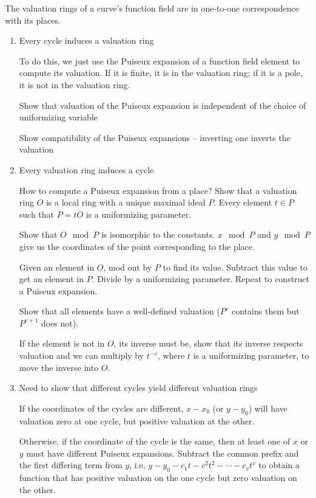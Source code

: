 \begin{theorem}
The valuation rings of a curve's function field are in one-to-one correspondence with its places.

\proof
\begin{enumerate}
\item Every cycle induces a valuation ring

To do this, we just use the Puiseux expansion of a function field element to compute its valuation.
If it is finite, it is in the valuation ring; if it is a pole, it is not in the valuation ring.

Show that valuation of the Puiseux expansion is independent of the choice of uniformizing variable

Show compatibility of the Puiseux expansions -- inverting one inverts the valuation

\item Every valuation ring induces a cycle

How to compute a Puiseux expansion from a place?  Show that a valuation ring $O$ is a local ring
with a unique maximal ideal $P$.  Every element $t \in P$ such that $P=tO$ is a uniformizing parameter.

Show that $O \mod P$ is isomorphic to the constants.  $x \mod P$ and $y \mod P$ give us the coordinates
of the point corresponding to the place.

Given an element in $O$, mod out by $P$ to find its value.  Subtract this value to get an element in $P$.
Divide by a uniformizing parameter.  Repeat to construct a Puiseux expansion.

Show that all elements have a well-defined valuation ($P^v$ contains them but $P^{v+1}$ does not).

If the element is not in $O$, its inverse must be, show that its inverse respects valuation and we can
multiply by $t^{-v}$, where $t$ is a uniformizing parameter, to move the inverse into $O$.

\item Need to show that different cycles yield different valuation rings

If the coordinates of the cycles are different, $x-x_0$ (or $y-y_0$) will have valuation zero at
one cycle, but positive valuation at the other.

Otherwise, if the coordinate of the cycle is the same, then at least one of $x$ or $y$ must have
different Puiseux expansions.  Subtract the common prefix and the first differing term from $y$,
i.e, $y-y_0-c_1 t-c^2 t^2-\cdots-c_v t^v$ to obtain a function that has positive valuation
on the one cycle but zero valuation on the other.

\end{enumerate}
\end{theorem}

